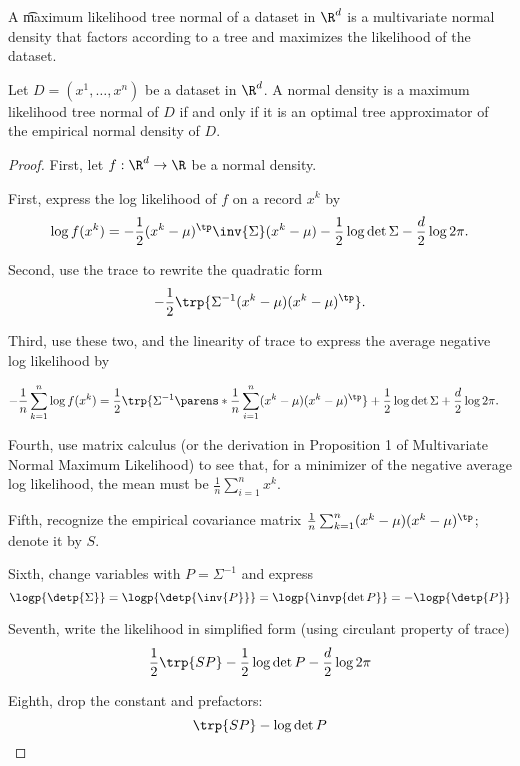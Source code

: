 
A \t{maximum likelihood tree normal} of a dataset in $\R^d$ is a multivariate normal density that factors according to a tree and maximizes the likelihood of the dataset.


\begin{prop}

Let $D = (x^1, \dots, x^n)$ be a dataset in $\R^d$.
A normal density is a maximum likelihood tree normal of $D$ if and only if it is an optimal tree approximator of the empirical normal density of $D$.

\begin{proof}

First, let $f: \R^d \to \R$ be a normal density.

First, express the log likelihood of $f$ on a record $x^k$ by
$$
  \log f(x^k) = - \frac{1}{2} (x^k - \mu)^{\tp} \inv{\Sigma} (x^k - \mu) - \frac{1}{2} \log \det \Sigma - \frac{d}{2}\log 2\pi.
$$

Second, use the trace to rewrite the quadratic form
$$
  -\frac{1}{2}\trp{\Sigma^{-1} (x^k - \mu) (x^k - \mu)^{\tp}}.
$$

Third, use these two, and the linearity of trace to express the average negative log likelihood by

$$
  \begin{aligned}
    - \frac{1}{n} \sum_{k = 1}^{n} \log f(x^k) &= \frac{1}{2} \trp{\Sigma^{-1}\parens*{\frac{1}{n}\sum_{i = 1}^{n} (x^k - \mu)(x^k - \mu)^{\tp}}} + \frac{1}{2}\log\det\Sigma + \frac{d}{2}\log 2\pi.
  \end{aligned}
$$

  Fourth, use matrix calculus (or the derivation in Proposition 1 of Multivariate Normal Maximum Likelihood) to see that, for a minimizer of the negative average log likelihood, the mean must be $\frac{1}{n} \sum_{i = 1}^{n} x^k$.

  Fifth, recognize the empirical covariance matrix $\frac{1}{n}\sum_{k = 1}^{n} (x^k - \mu)(x^k - \mu)^{\tp}$; denote it by $S$.

Sixth, change variables with $P = \Sigma^{-1}$ and express
$$
  \logp{\detp{\Sigma}} = \logp{\detp{\inv{P}}} = \logp{\invp{\det P}} = -\logp{\detp{P}}
$$

  Seventh, write the likelihood in simplified form (using circulant property of trace)
$$
  \frac{1}{2} \trp{SP} - \frac{1}{2} \log \det P - \frac{d}{2}\log 2\pi
$$

Eighth, drop the constant and prefactors:
$$
  \trp{SP} - \log \det P
$$


\end{proof}
\end{prop}
